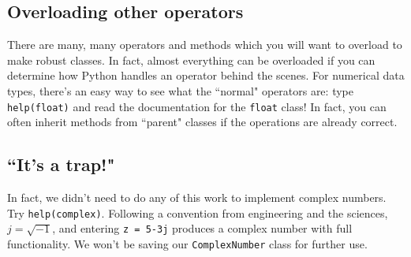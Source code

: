 \documentclass[m3380-lec-main.tex]{subfiles}
\begin{document}
\subsection{Overloading other operators} There are many, many operators and methods which you will want to overload to make robust classes. In fact, almost everything can be overloaded if you can determine how Python handles an operator behind the scenes. For numerical data types, there's an easy way to see what the ``normal" operators are: type \verb|help(float)| and read the documentation for the \verb|float| class! In fact, you can often inherit methods from ``parent" classes if the operations are already correct.

\subsection{``It's a trap!"} In fact, we didn't need to do any of this work to implement complex numbers. Try \verb|help(complex)|. Following a convention from engineering and the sciences, $j=\sqrt{-1}$, and entering \verb|z = 5-3j| produces a complex number with full functionality. We won't be saving our \verb|ComplexNumber| class for further use.
\end{document}
